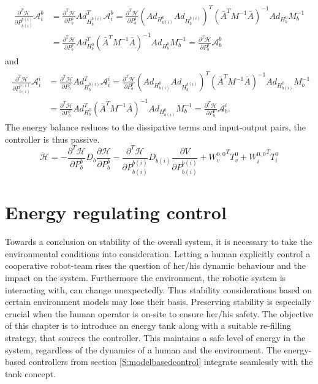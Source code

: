 \documentclass[a4paper,twoside, openright,12pt]{report}
\begin{document}
\begin{eqnarray}
\begin{aligned}
\frac{\partial^T \mathcal{H}}{\partial P_{b(i)}^{b(i)}} \mathcal{A}_i^b &= \frac{\partial^T \mathcal{H}}{\partial P_b^b}Ad_{H_b^{b(i)}}^T\mathcal{A}_i^b = \frac{\partial^T \mathcal{H}}{\partial P_b^b} (Ad_{H_{b(i)}^0}Ad_{H_b^{b(i)}})^T (\bar{A}^TM^{-1}\bar{A})^{-1} Ad_{H_b^0}M_b^{-1}
 \\ 
&= \frac{\partial^T \mathcal{H}}{\partial P_b^b} Ad_{H_b^0}^T (\bar{A}^TM^{-1}\bar{A})^{-1} Ad_{H_b^0}M_b^{-1} = \frac{\partial^T \mathcal{H}}{\partial P_b^b} \mathcal{A}_b^b
\end{aligned}
\end{eqnarray}
and
\begin{eqnarray}
\begin{aligned}
\frac{\partial^T \mathcal{H}}{\partial P_{b(i)}^{b(i)}} \mathcal{A}_i^i &= \frac{\partial^T \mathcal{H}}{\partial P_b^b}Ad_{H_b^{b(i)}}^T\mathcal{A}_i^i = \frac{\partial^T \mathcal{H}}{\partial P_b^b} (Ad_{H_{b(i)}^0}Ad_{H_b^{b(i)}})^T (\bar{A}^TM^{-1}\bar{A})^{-1} Ad_{H_{b(i)}^0}M_b^{-1}  \\ 
&= \frac{\partial^T \mathcal{H}}{\partial P_b^b} Ad_{H_b^0}^T (\bar{A}^TM^{-1}\bar{A})^{-1} Ad_{H_{b(i)}^0}M_b^{-1} = \frac{\partial^T \mathcal{H}}{\partial P_b^b} \mathcal{A}_b^i.
\end{aligned}
\end{eqnarray}
The energy balance reduces to the dissipative terms and input-output pairs, the controller is thus passive.
\begin{equation}
\dot{\mathcal{H}} = -\frac{\partial^T \mathcal{H}}{\partial P_b^b} D_b \frac{\partial \mathcal{H}}{\partial P_b^b} - \frac{\partial^T \mathcal{H}}{\partial P_{b(i)}^{b(i)}} D_{b(i)} \frac{\partial V}{\partial P_{b(i)}^{b(i)}} + {W_v^{0,0}}^T T_v^0 + {W_i^{0,0}}^T T_i^0
\end{equation}
 


\chapter{Energy regulating control}\label{C:Energy-aware control}
Towards a conclusion on stability of the overall system, it is necessary to take the environmental conditions into consideration. Letting a human explicitly control a cooperative robot-team rises the question of her/his dynamic behaviour and the impact on the system. Furthermore the environment, the robotic system is interacting with, can change unexpectedly. Thus stability considerations based on certain environment models may lose their basis. Preserving stability is especially crucial when the human operator is on-site to ensure her/his safety. The objective of this chapter is to introduce an energy tank along with a suitable re-filling strategy, that sources the controller. This maintains a safe level of energy in the system, regardless of the dynamics of a human and the environment. The energy-based controllers from section \ref{S:modelbasedcontrol} integrate seamlessly with the tank concept.
\end{document}
